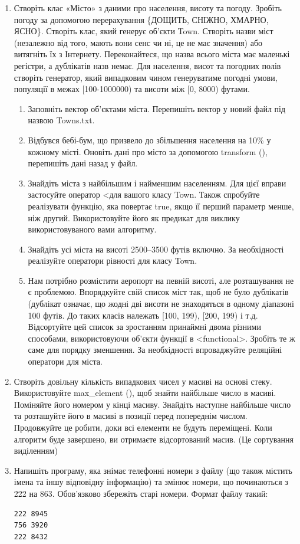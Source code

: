\documentclass[a5paper,titlepage,openany,twoside,
]
{book_unv}%
\makeatletter
\newcommand{\xslalph}[1]{\expandafter\@xslalph\csname c@#1\endcsname}
\newcommand{\@xslalph}[1]{%
    \ifcase#1\or а\or б\or в\or г\or д\or e\or є\or ж\or з\or i%
    \or й\or к\or л\or м\or н\or о\or п\or р\or с\or т%
    \or у\or ф\or х\or ц\or ч\or ш\or ю\or я\or аа\or бб\or вв%
    \else\@ctrerr\fi%
}
\makeatother
\begin{document}
\begin{enumerate}
\begin{enumerate}
\begin{enumerate}
\item
  Створіть клас «Місто» з даними про населення, висоту та погоду.
  Зробіть погоду за допомогою перерахування \{ДОЩИТЬ, СНІЖНО, ХМАРНО,
  ЯСНО\}. Створіть клас, який генерує об'єкти Town. Створіть назви міст
  (незалежно від того, мають вони сенс чи ні, це не має значення) або
  витягніть їх з Інтернету. Переконайтеся, що назва всього міста має
  маленькі регістри, а дублікатів назв немає. Для населення, висот та погодних
  полів створіть генератор, який випадковим чином генеруватиме погодні
  умови, популяції в межах {[}100-1000000) та висоти між {[}0, 8000)
  футами. 
\begin{enumerate}[label=\xslalph*)]
\item
Заповніть вектор об'єктами міста. Перепишіть вектор у новий
  файл під назвою Towns.txt. 
 
  \item
 Відбувся бебі-бум, що призвело до збільшення населення на 10\% у кожному
місті. Оновіть дані про місто за допомогою transform (), перепишіть дані
назад у файл. 
\item
Знайдіть міста з найбільшим і найменшим населенням. Для цієї вправи
  застосуйте оператор \textless{}для вашого класу Town. Також спробуйте
  реалізувати функцію, яка повертає true, якщо її перший параметр менше,
  ніж другий. Використовуйте його як предикат для виклику
  використовуваного вами алгоритму.
 \item
Знайдіть усі міста на висоті 2500--3500 футів включно. За необхідності
реалізуйте оператори рівності для класу Town.
 \item
  Нам потрібно розмістити аеропорт на певній висоті, але розташування не
  є проблемою. Впорядкуйте свій список міст так, щоб не було дублікатів
  (дублікат означає, що жодні дві висоти не знаходяться в одному
  діапазоні 100 футів. До таких класів належать {[}100, 199), {[}200,
  199) і т.д. Відсортуйте цей список за зростанням принаймні двома
  різними способами, використовуючи об'єкти функції в
  \textless{}functional\textgreater{}. Зробіть те ж саме для порядку
  зменшення. За необхідності впроваджуйте реляційні оператори для міста.
\end{enumerate}

\item
  Створіть довільну кількість випадкових чисел у масиві на основі стеку.
  Використовуйте max\_element (), щоб знайти найбільше число в масиві.
  Поміняйте його номером у кінці масиву. Знайдіть наступне найбільше
  число та розташуйте його в масиві в позиції перед попереднім числом.
  Продовжуйте це робити, доки всі елементи не будуть переміщені. Коли
  алгоритм буде завершено, ви отримаєте відсортований масив. (Це
  сортування виділенням)
\item
  Напишіть програму, яка знімає телефонні номери з файлу (що також
  містить імена та іншу відповідну інформацію) та змінює номери, що
  починаються з 222 на 863. Обов'язково збережіть старі номери. Формат
  файлу такий:
\begin{verbatim}
222 8945
756 3920
222 8432
\end{verbatim}


\end{enumerate}
\end{enumerate}
\end{enumerate}
\end{document}
